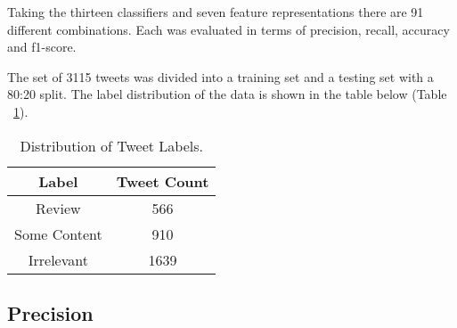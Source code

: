 Taking the thirteen classifiers and seven feature representations there are 91 different combinations. Each was evaluated in terms of precision, recall, accuracy and f1-score.

The set of 3115 tweets was divided into a training set and a testing set with a 80:20 split. The label distribution of the data is shown in the table below (Table ~\ref{Table:tweetlabels}).

\begin{table}[h!]
\setlength\extrarowheight{5pt}
\caption{Distribution of Tweet Labels.}
\label{Table:tweetlabels}
\begin{tabular}{|c|c|}
\hline
\textbf{Label} & \textbf{Tweet Count} \\ \hline
Review         & 566                  \\ \hline
Some Content   & 910                  \\ \hline
Irrelevant     & 1639                 \\ \hline
\end{tabular}
\end{table}

\subsection*{Precision}

